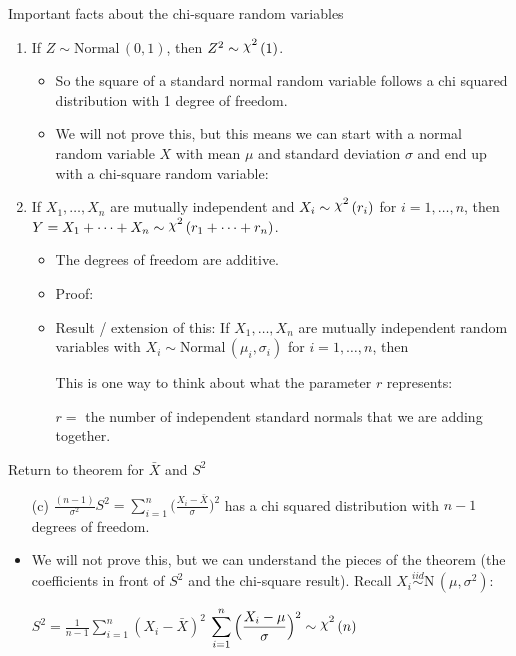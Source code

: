 \documentclass{article}
\newcommand{\vecn}[2]{#1_1, \ldots, #1_{#2}}	%
\newcommand{\follow}[1]{\sim \text{#1}\,}		%
\newcommand{\followsp}[2]{\overset{#1}\sim \text{#2}\,}		%
\newcommand{\chisq}{\raisebox{2pt}{$\chi^2$}}		%
\begin{document}
Important facts about the chi-square random variables\bigskip
\begin{enumerate}
    \item If $Z \follow{Normal}(0, 1)$, then $Z^2 \follow{\chisq}(1)$.
    \begin{itemize}
        \item So the square of a standard normal random variable follows a chi squared distribution with 1 degree of freedom. 
        \item We will not prove this, but this means we can start with a normal random variable $X$ with mean $\mu$ and standard deviation $\sigma$ and end up with a chi-square random variable:\vspace{30pt}
    \end{itemize}
    \item If $\vecn{X}{n}$ are mutually independent and $X_i \follow{\chisq}(r_i)$ for $i = 1, \ldots, n$, then \\ $Y = X_1 + \cdots + X_n \follow{\chisq}(r_1 + \cdots + r_n)$.
    \begin{itemize}
        \item The degrees of freedom are additive.
        \item Proof:\vspace{110pt}
        \item Result / extension of this: If $\vecn{X}{n}$ are mutually independent random variables with $X_i \follow{Normal}(\mu_i, \sigma_i)$ for $i = 1, \ldots, n$, then\vspace{70pt}
        \item[] This is one way to think about what the parameter $r$ represents:
        \item[] $r = $ the number of independent standard normals that we are adding together.
    \end{itemize}
\end{enumerate}\bigskip

Return to theorem for $\bar{X}$ and $S^2$\bigskip
\begin{itemize}
    \item[(c)] $\displaystyle \frac{(n-1)}{\sigma^2} S^2 = \displaystyle \sum_{i = 1}^n \Big(\frac{X_i - \bar{X}}{\sigma}\Big)^2$ has a chi squared distribution with $n - 1$ degrees of freedom.
    \item We will not prove this, but we can understand the pieces of the theorem (the coefficients in front of $S^2$ and the chi-square result). Recall $X_i \followsp{iid}{N}(\mu,\sigma^2)$:\vspace{20pt}
        \item[] $\displaystyle S^2 = \frac{1}{n - 1} \sum_{i = 1}^n (X_i - \bar{X})^2$ \hspace{150pt} $\displaystyle \sum_{i = 1}^n \Big(\frac{X_i - \mu}{\sigma}\Big)^2 \follow{\chisq}(n)$\vspace{275pt}
\end{itemize}\bigskip
\end{document}
